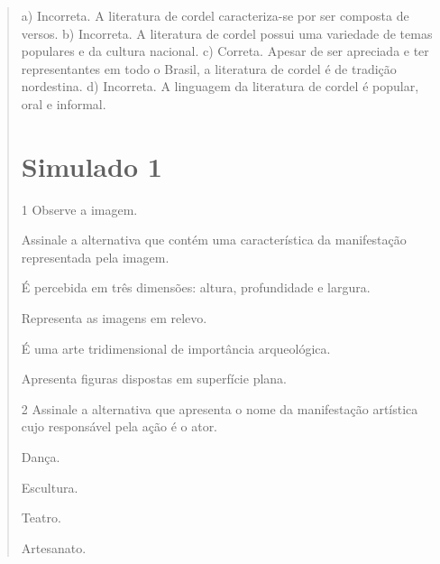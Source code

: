 \begin{escolha}
\begin{quote}
{a) Incorreta. A literatura de cordel caracteriza-se por ser composta de versos.
b) Incorreta. A literatura de cordel possui uma variedade de temas
  populares e da cultura nacional.
c) Correta. Apesar de ser apreciada e ter representantes em todo o
  Brasil, a literatura de cordel é de tradição nordestina.
d) Incorreta. A linguagem da literatura de cordel é popular, oral e
  informal.}




\chapter{Simulado 1}

\num{1}  Observe a imagem.


Assinale a alternativa que contém uma característica da manifestação representada pela imagem.

\begin{escolha}
\item
  É percebida em três dimensões: altura, profundidade e largura.
\item
  Representa as imagens em relevo.
\item
  É uma arte tridimensional de importância arqueológica.
\item
  Apresenta figuras dispostas em superfície plana.
\end{escolha}


\num{2}  Assinale a alternativa que apresenta o nome da manifestação artística
  cujo responsável pela ação é o ator.

\begin{escolha}
\item
  Dança.
\item
  Escultura.
\item
  Teatro.
\item
  Artesanato.
\end{escolha}


\end{quote}
\end{escolha}
